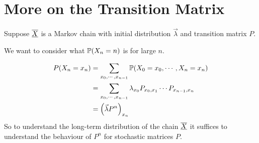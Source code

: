\documentclass[../Main.tex]{subfiles}
\begin{document}
\section{More on the Transition Matrix}
Suppose $\chain{X}$ is a Markov chain with initial distribution $\vec{\lambda}$ and transition matrix $P$.

We want to consider what $\P(X_n = n)$ is for large $n$.

\begin{align*}
    P(X_n = x_n) &= \sum_{x_0, \cdots, x_{n - 1}} \P(X_0 = x_0, \cdots, X_n = x_n) \\
    &= \sum_{x_0, \cdots, x_{n-1}} \lambda_{x_0} \Pmat{0}{1} \cdots \Pmat{n-1}{n} \\
    &= \left(\vec{\lambda} P^n\right)_{x_n}
\end{align*}
So to understand the long-term distribution of the chain $\chain{X}$ it suffices to understand the behaviour of $P^n$ for stochastic matrices $P$.
\end{document}
